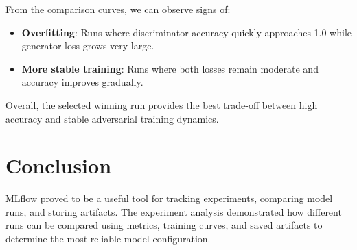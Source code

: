 \documentclass[12pt]{article}
\begin{document}
From the comparison curves, we can observe signs of:

\begin{itemize}
\item \textbf{Overfitting}: Runs where discriminator accuracy quickly 
approaches 1.0 while generator loss grows very large.
\item \textbf{More stable training}: Runs where both losses remain moderate 
and accuracy improves gradually.
\end{itemize}

Overall, the selected winning run provides the best trade-off between high 
accuracy and stable adversarial training dynamics.

\section{Conclusion}

MLflow proved to be a useful tool for tracking experiments, comparing model 
runs, and storing artifacts. The experiment analysis demonstrated how 
different runs can be compared using metrics, training curves, and saved 
artifacts to determine the most reliable model configuration.
\end{document}
